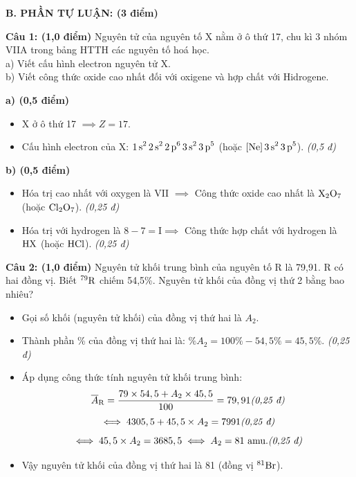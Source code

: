 \documentclass[11pt,a4paper]{article}
\begin{document}
\vspace{6pt}
\noindent
{\color{mainGreen}\textbf{\Large B. PHẦN TỰ LUẬN: (3 điểm)}}
\vspace{2pt}

\noindent
\textbf{Câu 1: (1,0 điểm)} Nguyên tử của nguyên tố X nằm ở ô thứ 17, chu kì 3 nhóm VIIA trong bảng HTTH các nguyên tố hoá học.\\
a) Viết cấu hình electron nguyên tử X.\\
b) Viết công thức oxide cao nhất đối với oxigene và hợp chất với Hidrogene.

\begin{tcolorbox}[colback=white,colframe=solBlue,title=\textbf{Lời giải chi tiết và Biểu điểm Câu 1:}]
\textbf{a) (0,5 điểm)}
\begin{itemize}[leftmargin=1.2cm]
\item X ở ô thứ 17 $\implies Z = 17$.
\item Cấu hình electron của X: $\ce{1s^2 2s^2 2p^6 3s^2 3p^5}$ (hoặc $\ce{[Ne] 3s^2 3p^5}$). \hfill \textit{(0,5 đ)}
\end{itemize}
\textbf{b) (0,5 điểm)}
\begin{itemize}[leftmargin=1.2cm]
\item Hóa trị cao nhất với oxygen là VII $\implies$ Công thức oxide cao nhất là $\ce{X2O7}$ (hoặc $\ce{Cl2O7}$). \hfill \textit{(0,25 đ)}
\item Hóa trị với hydrogen là $8 - 7 = \text{I} \implies$ Công thức hợp chất với hydrogen là $\ce{HX}$ (hoặc $\ce{HCl}$). \hfill \textit{(0,25 đ)}
\end{itemize}
\end{tcolorbox}

\vspace{4pt}
\noindent
\textbf{Câu 2: (1,0 điểm)} Nguyên tử khối trung bình của nguyên tố R là 79,91. R có hai đồng vị. Biết $^{79}\ce{R}$ chiếm 54,5\%. Nguyên tử khối của đồng vị thứ 2 bằng bao nhiêu?

\begin{tcolorbox}[colback=white,colframe=solBlue,title=\textbf{Lời giải chi tiết và Biểu điểm Câu 2:}]
\begin{itemize}[leftmargin=1.2cm]
\item Gọi số khối (nguyên tử khối) của đồng vị thứ hai là $A_2$.
\item Thành phần \% của đồng vị thứ hai là: $\%A_2 = 100\% - 54,5\% = 45,5\%$. \hfill \textit{(0,25 đ)}
\item Áp dụng công thức tính nguyên tử khối trung bình:
$$\overline{A}_{\ce{R}} = \dfrac{79 \times 54,5 + A_2 \times 45,5}{100} = 79,91 \hfill \textit{(0,25 đ)}$$
$$\iff 4305,5 + 45,5 \times A_2 = 7991 \hfill \textit{(0,25 đ)}$$
$$\iff 45,5 \times A_2 = 3685,5 \iff A_2 = 81\text{ amu}. \hfill \textit{(0,25 đ)}$$
\item Vậy nguyên tử khối của đồng vị thứ hai là 81 (đồng vị $^{81}\ce{Br}$).
\end{itemize}
\end{tcolorbox}
\end{document}
